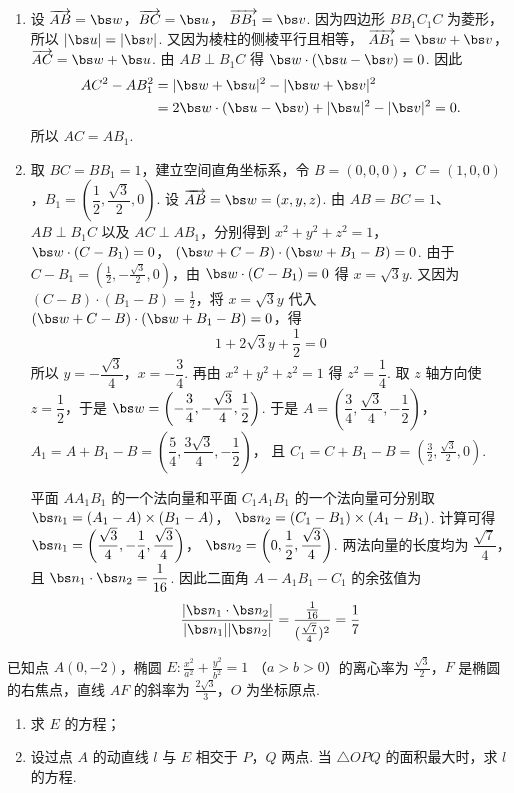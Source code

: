 \begin{solution}
\begin{enumerate}
\item 设 \(\overrightarrow{AB}=\bs w\)，\(\overrightarrow{BC}=\bs u\)，
\(\overrightarrow{BB_1}=\bs v\). 因为四边形 \(BB_1C_1C\) 为菱形，所以
\(|\bs u|=|\bs v|\). 又因为棱柱的侧棱平行且相等，
\(\overrightarrow{AB_1}=\bs w+\bs v\)，\(\overrightarrow{AC}=\bs w+\bs u\).
由 \(AB\perp B_1C\) 得
\(\bs w\cdot(\bs u-\bs v)=0\). 因此
\[
\begin{aligned}
AC^2-AB_1^2
&=|\bs w+\bs u|^2-|\bs w+\bs v|^2\\
&=2\bs w\cdot(\bs u-\bs v)+|\bs u|^2-|\bs v|^2=0.
\end{aligned}
\]
所以 \(AC=AB_1\).

\item 取 \(BC=BB_1=1\)，建立空间直角坐标系，令
\(B=(0,0,0)\)，\(C=(1,0,0)\)，\(B_1=\left(\dfrac12,\dfrac{\sqrt3}{2},0\right)\).
设 \(\overrightarrow{AB}=\bs w=(x,y,z)\). 由 \(AB=BC=1\)、
\(AB\perp B_1C\) 以及 \(AC\perp AB_1\)，分别得到
\(x^2+y^2+z^2=1\)，\(\bs w\cdot(C-B_1)=0\)，
\((\bs w+C-B)\cdot(\bs w+B_1-B)=0\).
由于 \(C-B_1=\left(\frac12,-\frac{\sqrt3}{2},0\right)\)，由
\(\bs w\cdot(C-B_1)=0\) 得 \(x=\sqrt3y\). 又因为
\((C-B)\cdot(B_1-B)=\frac12\)，将 \(x=\sqrt3y\) 代入
\((\bs w+C-B)\cdot(\bs w+B_1-B)=0\)，得
\[
1+2\sqrt3y+\frac12=0
\]
所以 \(y=-\dfrac{\sqrt3}{4}\)，\(x=-\dfrac34\). 再由
\(x^2+y^2+z^2=1\) 得 \(z^2=\dfrac14\). 取 \(z\) 轴方向使
\(z=\dfrac12\)，于是
\(\bs w=\left(-\dfrac34,-\dfrac{\sqrt3}{4},\dfrac12\right)\).
于是
\(A=\left(\dfrac34,\dfrac{\sqrt3}{4},-\dfrac12\right)\)，
\(A_1=A+B_1-B=\left(\dfrac54,\dfrac{3\sqrt3}{4},-\dfrac12\right)\)，
且 \(C_1=C+B_1-B=\left(\frac32,\frac{\sqrt3}{2},0\right)\).

平面 \(AA_1B_1\) 的一个法向量和平面 \(C_1A_1B_1\) 的一个法向量可分别取
\(\bs n_1=(A_1-A)\times(B_1-A)\)，
\(\bs n_2=(C_1-B_1)\times(A_1-B_1)\).
计算可得
\(\bs n_1=\left(\dfrac{\sqrt3}{4},-\dfrac14,\dfrac{\sqrt3}{4}\right)\)，
\(\bs n_2=\left(0,\dfrac12,\dfrac{\sqrt3}{4}\right)\).
两法向量的长度均为 \(\dfrac{\sqrt7}{4}\)，且
\(\bs n_1\cdot\bs n_2=\dfrac1{16}\). 因此二面角
\(A-A_1B_1-C_1\) 的余弦值为
\[
\frac{|\bs n_1\cdot\bs n_2|}{|\bs n_1||\bs n_2|}
 =\frac{\frac{1}{16}}{(\frac{\sqrt7}{4})^2}=\frac17
\]
\end{enumerate}
\end{solution}

\begin{problem}
已知点 \(A(0, -2)\)，椭圆 \(E: \frac{x^2}{a^2} + \frac{y^2}{b^2} = 1 \) （\(a > b > 0\)）的离心率为 \(\frac{\sqrt{3}}{2}\)，\(F\) 是椭圆的右焦点，直线 \(AF\) 的斜率为 \(\frac{2\sqrt{3}}{3}\)，\(O\) 为坐标原点.

\begin{enumerate}
\item 求 \(E\) 的方程；
\item 设过点 \(A\) 的动直线 \(l\) 与 \(E\) 相交于 \(P\)，\(Q\) 两点. 当 \(\triangle OPQ\) 的面积最大时，求 \(l\) 的方程.
\end{enumerate}
\end{problem}

